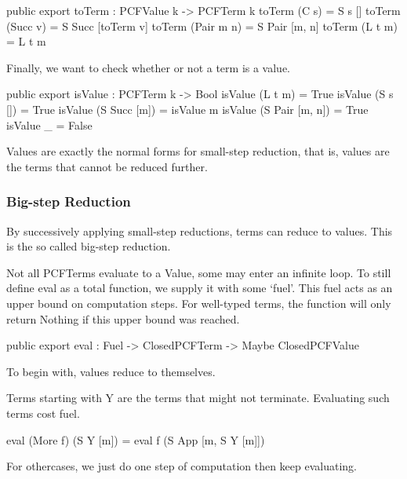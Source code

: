 \begin{code}
public export
toTerm : PCFValue k -> PCFTerm k
toTerm (C s)      = S s []
toTerm (Succ v)   = S Succ [toTerm v]
toTerm (Pair m n) = S Pair [m, n]
toTerm (L t m)    = L t m
\end{code}

Finally, we want to check whether or not a term is a value.

\begin{code}
public export
isValue : PCFTerm k -> Bool
isValue (L t m)         = True
isValue (S s [])        = True
isValue (S Succ [m])    = isValue m
isValue (S Pair [m, n]) = True
isValue _               = False
\end{code}

Values are exactly the normal forms for small-step reduction, that is, values
are the terms that cannot be reduced further.

\subsubsection{Big-step Reduction}

By successively applying small-step reductions, terms can reduce to values.
This is the so called big-step reduction.

Not all PCFTerms evaluate to a Value, some may enter an infinite loop.
To still define eval as a total function, we supply it with some `fuel'.
This fuel acts as an upper bound on computation steps. For well-typed terms,
the function will only return Nothing if this upper bound was reached.

\begin{code}
public export
eval : Fuel -> ClosedPCFTerm -> Maybe ClosedPCFValue
\end{code}

To begin with, values reduce to themselves.


Terms starting with Y are the terms that might not terminate.
Evaluating such terms cost fuel.

\begin{code}
eval (More f) (S Y [m]) = eval f (S App [m, S Y [m]])
\end{code}

For othercases, we just do one step of computation then keep evaluating.

